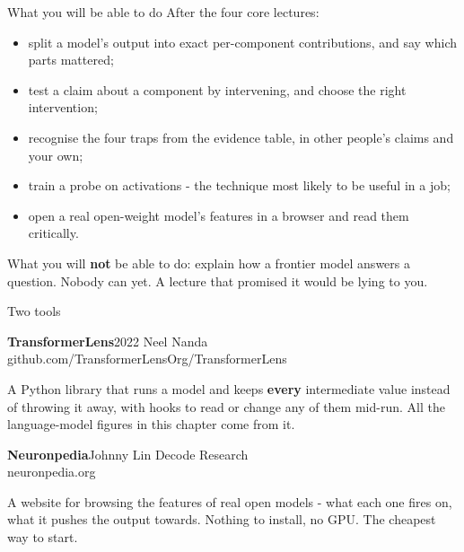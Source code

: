 \documentclass[aspectratio=169]{beamer}
\newcommand{\trapbox}[1]{%
  \begin{tcolorbox}[colback=armred!8, colframe=armred, boxrule=0.6pt, arc=2pt]
  #1
  \end{tcolorbox}}
\newcommand{\toolcard}[3]{%
  \begin{tcolorbox}[colback=lightbg, colframe=popblue, boxrule=0.6pt, arc=2pt]
    {\large\bfseries\color{popblue} #1}\hfill{\small #2}\\[0.2em]
    {\small\ttfamily #3}
  \end{tcolorbox}}
\begin{document}
\begin{frame}{What you will be able to do}
  \vspace{0.5em}
  After the four core lectures:

  \vspace{0.5em}
  \begin{itemize}
    \item split a model's output into exact per-component contributions, and say which parts
      mattered;
    \item test a claim about a component by intervening, and choose the right intervention;
    \item recognise the four traps from the evidence table, in other people's claims and your own;
    \item train a probe on activations - the technique most likely to be useful in a job;
    \item open a real open-weight model's features in a browser and read them critically.
  \end{itemize}

  \vspace{0.8em}
  \trapbox{\small What you will \textbf{not} be able to do: explain how a frontier model answers a
  question. Nobody can yet. A lecture that promised it would be lying to you.}
\end{frame}

\begin{frame}{Two tools}
  \vspace{0.6em}
  \toolcard{TransformerLens}{2022 \textperiodcentered{} Neel Nanda}{github.com/TransformerLensOrg/TransformerLens}

  \vspace{0.2em}
  {\small A Python library that runs a model and keeps \textbf{every} intermediate value instead of
  throwing it away, with hooks to read or change any of them mid-run. All the language-model
  figures in this chapter come from it.}

  \vspace{0.9em}
  \toolcard{Neuronpedia}{Johnny Lin \textperiodcentered{} Decode Research}{neuronpedia.org}

  \vspace{0.2em}
  {\small A website for browsing the features of real open models - what each one fires on, what it
  pushes the output towards. Nothing to install, no GPU. The cheapest way to start.}
\end{frame}
\end{document}
